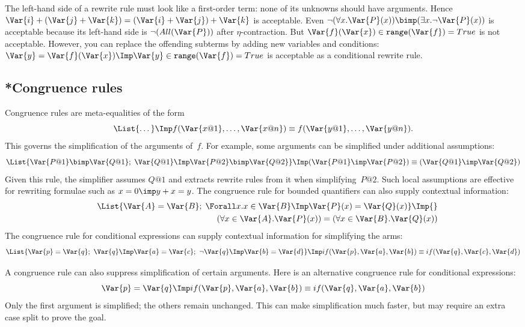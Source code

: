 \begin{warn}
  The left-hand side of a rewrite rule must look like a first-order term:
  none of its unknowns should have arguments.  Hence
  ${\Var{i}+(\Var{j}+\Var{k})} = {(\Var{i}+\Var{j})+\Var{k}}$ is
  acceptable.  Even $\neg(\forall x.\Var{P}(x)) \bimp (\exists
  x.\neg\Var{P}(x))$ is acceptable because its left-hand side is
  $\neg(All(\Var{P}))$ after $\eta$-contraction.  But ${\Var{f}(\Var{x})\in
    {\tt range}(\Var{f})} = True$ is not acceptable.  However, you can
  replace the offending subterms by adding new variables and conditions:
  $\Var{y} = \Var{f}(\Var{x}) \Imp \Var{y}\in {\tt range}(\Var{f}) = True$
  is acceptable as a conditional rewrite rule.
\end{warn}


\subsection{*Congruence rules}
Congruence rules are meta-equalities of the form
\[ \List{\dots} \Imp
   f(\Var{x@1},\ldots,\Var{x@n}) \equiv f(\Var{y@1},\ldots,\Var{y@n}).
\]
This governs the simplification of the arguments of~$f$.  For
example, some arguments can be simplified under additional assumptions:
\[ \List{\Var{P@1} \bimp \Var{Q@1};\; \Var{Q@1} \Imp \Var{P@2} \bimp \Var{Q@2}}
   \Imp (\Var{P@1} \imp \Var{P@2}) \equiv (\Var{Q@1} \imp \Var{Q@2})
\]
Given this rule, the simplifier assumes $Q@1$ and extracts rewrite rules
from it when simplifying~$P@2$.  Such local assumptions are effective for
rewriting formulae such as $x=0\imp y+x=y$.  The congruence rule for bounded
quantifiers can also supply contextual information:
\begin{eqnarray*}
  &&\List{\Var{A}=\Var{B};\; 
          \Forall x. x\in \Var{B} \Imp \Var{P}(x) = \Var{Q}(x)} \Imp{} \\
 &&\qquad\qquad
    (\forall x\in \Var{A}.\Var{P}(x)) = (\forall x\in \Var{B}.\Var{Q}(x))
\end{eqnarray*}
The congruence rule for conditional expressions can supply contextual
information for simplifying the arms:
\[ \List{\Var{p}=\Var{q};~ \Var{q} \Imp \Var{a}=\Var{c};~
         \neg\Var{q} \Imp \Var{b}=\Var{d}} \Imp
   if(\Var{p},\Var{a},\Var{b}) \equiv if(\Var{q},\Var{c},\Var{d})
\]

A congruence rule can also suppress simplification of certain arguments.
Here is an alternative congruence rule for conditional expressions:
\[ \Var{p}=\Var{q} \Imp
   if(\Var{p},\Var{a},\Var{b}) \equiv if(\Var{q},\Var{a},\Var{b})
\]
Only the first argument is simplified; the others remain unchanged.
This can make simplification much faster, but may require an extra case split
to prove the goal.  

